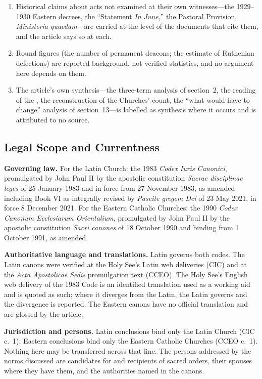 \begin{enumerate}[leftmargin=1.45em,itemsep=0.25em]
\item Historical claims about acts not examined at their own witnesses---the 1929--1930 Eastern decrees, the ``Statement \emph{In June},'' the Pastoral Provision, \emph{Ministeria quaedam}---are carried at the level of the documents that cite them, and the article says so at each.
\item Round figures (the number of permanent deacons; the estimate of Ruthenian defections) are reported background, not verified statistics, and no argument here depends on them.
\item The article's own synthesis---the three-term analysis of section~2, the reading of the , the reconstruction of the Churches' count, the ``what would have to change'' analysis of section~13---is labelled as synthesis where it occurs and is attributed to no source.
\end{enumerate}

\subsection{Legal Scope and Currentness}

\textbf{Governing law.} For the Latin Church: the 1983 \emph{Codex Iuris Canonici}, promulgated by John Paul II by the apostolic constitution \emph{Sacrae disciplinae leges} of 25 January 1983 and in force from 27 November 1983, as amended---including Book VI as integrally revised by \emph{Pascite gregem Dei} of 23 May 2021, in force 8 December 2021. For the Eastern Catholic Churches: the 1990 \emph{Codex Canonum Ecclesiarum Orientalium}, promulgated by John Paul II by the apostolic constitution \emph{Sacri canones} of 18 October 1990 and binding from 1 October 1991, as amended.

\textbf{Authoritative language and translations.} Latin governs both codes. The Latin canons were verified at the Holy See's Latin web deliveries (CIC) and at the \emph{Acta Apostolicae Sedis} promulgation text (CCEO). The Holy See's English web delivery of the 1983 Code is an identified translation used as a working aid and is quoted as such; where it diverges from the Latin, the Latin governs and the divergence is reported. The Eastern canons have no official translation and are glossed by the article.

\textbf{Jurisdiction and persons.} Latin conclusions bind only the Latin Church (CIC c.~1); Eastern conclusions bind only the Eastern Catholic Churches (CCEO c.~1). Nothing here may be transferred across that line. The persons addressed by the norms discussed are candidates for and recipients of sacred orders, their spouses where they have them, and the authorities named in the canons.

